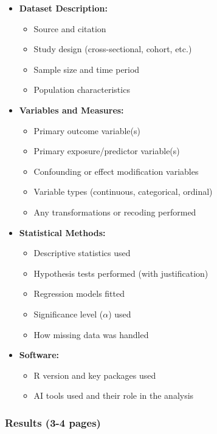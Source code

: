 \documentclass[11pt]{article}
\begin{document}
\begin{itemize}
\item \textbf{Dataset Description:}
  \begin{itemize}
  \item Source and citation
  \item Study design (cross-sectional, cohort, etc.)
  \item Sample size and time period
  \item Population characteristics
  \end{itemize}

\item \textbf{Variables and Measures:}
  \begin{itemize}
  \item Primary outcome variable(s)
  \item Primary exposure/predictor variable(s)
  \item Confounding or effect modification variables
  \item Variable types (continuous, categorical, ordinal)
  \item Any transformations or recoding performed
  \end{itemize}

\item \textbf{Statistical Methods:}
  \begin{itemize}
  \item Descriptive statistics used
  \item Hypothesis tests performed (with justification)
  \item Regression models fitted
  \item Significance level ($\alpha$) used
  \item How missing data was handled
  \end{itemize}

\item \textbf{Software:}
  \begin{itemize}
  \item R version and key packages used
  \item \textcolor{aiblue}{AI tools used and their role in the analysis}
  \end{itemize}
\end{itemize}

\subsubsection{Results (3-4 pages)}
\end{document}
